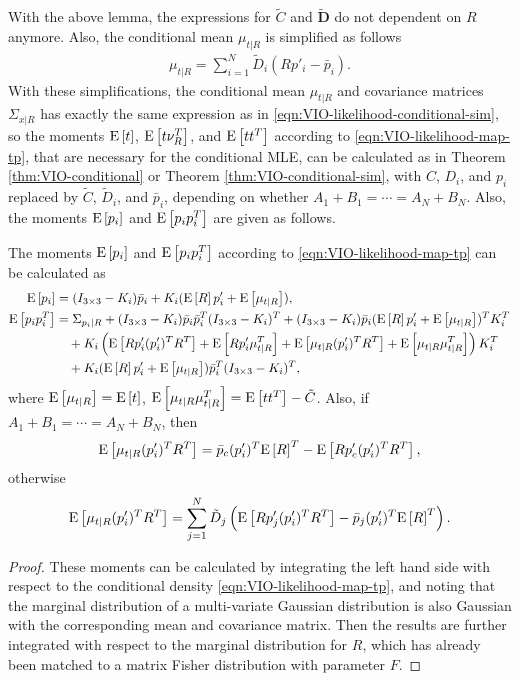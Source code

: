With the above lemma, the expressions for $\tilde{C}$ and $\tilde{\mathbf{D}}$ do not dependent on $R$ anymore.
Also, the conditional mean $\mu_{t|R}$ is simplified as follows
\begin{align}
	\mu_{t|R} = \sum_{i=1}^N \tilde{D}_i(Rp'_i-\bar{p}_i).
\end{align}
With these simplifications, the conditional mean $\mu_{t|R}$ and covariance matrices $\Sigma_{x|R}$ has exactly the same expression as in \eqref{eqn:VIO-likelihood-conditional-sim}, so the moments $\mathrm{E}\left[ t \right]$, $\mathrm{E}\left[ t\nu_R^T \right]$, and $\mathrm{E}\left[ tt^T \right]$ according to \eqref{eqn:VIO-likelihood-map-tp}, that are necessary for the conditional MLE, can be calculated as in Theorem \ref{thm:VIO-conditional} or Theorem \ref{thm:VIO-conditional-sim}, with $C$, $D_i$, and $p_i$ replaced by $\tilde{C}$, $\tilde{D}_i$, and $\bar{p}_i$, depending on whether $A_1+B_1 = \cdots = A_N+B_N$.
Also, the moments $\mathrm{E}\left[ p_i \right]$ and $\mathrm{E}\left[ p_ip_i^T \right]$ are given as follows.

\begin{theorem} \label{thm:VIO-likelihood-Ep}
	The moments $\mathrm{E}\left[ p_i \right]$ and $\mathrm{E}\left[ p_ip_i^T \right]$ according to \eqref{eqn:VIO-likelihood-map-tp} can be calculated as
	\begin{align}
		\mathrm{E}\left[ p_i \right] &= (I_{3\times 3}-K_i)\bar{p}_i + K_i(\mathrm{E}\left[ R \right]p'_i+\mathrm{E}\left[ \mu_{t|R} \right]), \\
		\mathrm{E}\left[ p_ip_i^T \right] &= \Sigma_{p_i|R} + (I_{3\times 3}-K_i)\bar{p}_i\bar{p}_i^T(I_{3\times 3}-K_i)^T + (I_{3\times 3}-K_i)\bar{p}_i (\mathrm{E}\left[ R \right]p'_i+\mathrm{E}\left[ \mu_{t|R} \right])^TK_i^T \nonumber \\
		&\quad + K_i \left(\mathrm{E}\left[ Rp'_i(p'_i)^TR^T \right] + \mathrm{E}\left[ Rp'_i\mu_{t|R}^T \right] + \mathrm{E}\left[ \mu_{t|R}(p'_i)^TR^T \right] + \mathrm{E}\left[ \mu_{t|R}\mu_{t|R}^T \right]\right) K_i^T \nonumber \\
		&\quad + K_i(\mathrm{E}\left[ R \right]p'_i+\mathrm{E}\left[ \mu_{t|R} \right])\bar{p}_i^T(I_{3\times 3}-K_i)^T,
	\end{align}
	where $\mathrm{E}\left[ \mu_{t|R} \right] = \mathrm{E}\left[ t \right]$, $\mathrm{E}\left[ \mu_{t|R}\mu_{t|R}^T \right] = \mathrm{E}\left[ tt^T \right] - \tilde{C}$.
	Also, if $A_1+B_1 = \cdots = A_N+B_N$, then
	\begin{align}
		\mathrm{E}\left[ \mu_{t|R}(p'_i)^TR^T \right] = \bar{p}_c(p'_i)^T\mathrm{E}\left[ R \right]^T - \mathrm{E}\left[ Rp'_c(p'_i)^TR^T \right],
	\end{align}
	otherwise
	\begin{align}
		\mathrm{E}\left[ \mu_{t|R}(p'_i)^TR^T \right] = \sum_{j=1}^N \tilde{D}_j \left(\mathrm{E}\left[ Rp'_j(p'_i)^TR^T \right] - \bar{p}_j(p'_i)^T\mathrm{E}\left[ R \right]^T\right).
	\end{align}
\end{theorem}
\begin{proof}
	These moments can be calculated by integrating the left hand side with respect to the conditional density \eqref{eqn:VIO-likelihood-map-tp}, and noting that the marginal distribution of a multi-variate Gaussian distribution is also Gaussian with the corresponding mean and covariance matrix.
	Then the results are further integrated with respect to the marginal distribution for $R$, which has already been matched to a matrix Fisher distribution with parameter $F$.
\end{proof}

